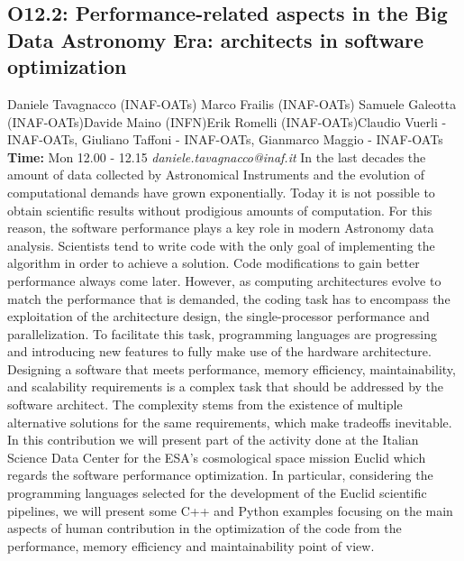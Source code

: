 \documentclass{report}
\begin{document}
\subsection*{O12.2: Performance-related aspects in the Big Data Astronomy Era: architects in software optimization}
\bigskip
Daniele Tavagnacco (INAF-OATs) \newline Marco Frailis (INAF-OATs) \newline  Samuele Galeotta (INAF-OATs)\newline  Davide Maino (INFN)\newline Erik Romelli (INAF-OATs)\newline  Claudio Vuerli - INAF-OATs, Giuliano Taffoni - INAF-OATs, Gianmarco Maggio - INAF-OATs\newline\newline
{\bf Time:} Mon 12.00 - 12.15\newline
\newline
{\it daniele.tavagnacco@inaf.it}\newline
\newline\newline
In the last decades the amount of data collected by Astronomical Instruments and the evolution of computational demands have grown exponentially. Today it is not possible to obtain scientific
results without prodigious amounts of computation. For this reason, the software performance plays a key role in modern Astronomy data analysis.
Scientists tend to write code with the only goal of implementing the algorithm in order to achieve a solution. Code modifications to gain better performance always come later. However, as computing
architectures evolve to match the performance that is demanded, the coding task has to encompass the exploitation of the architecture design, the single-processor performance and parallelization.
To facilitate this task, programming languages are progressing and introducing new features to fully make use of the hardware architecture. Designing a software that meets performance, memory
efficiency, maintainability, and scalability requirements is a complex task that should be addressed by the software architect. The complexity stems from the existence of multiple alternative solutions
for the same requirements, which make tradeoffs inevitable.
In this contribution we will present part of the activity done at the Italian Science Data Center for the ESA’s cosmological space mission Euclid which regards the software performance optimization.
In particular, considering the programming languages selected for the development of the Euclid scientific pipelines, we will present some C++ and Python examples focusing on the main aspects of human contribution in the optimization of the code from the performance, memory efficiency and maintainability point of view.\newline
\newpage
\end{document}
